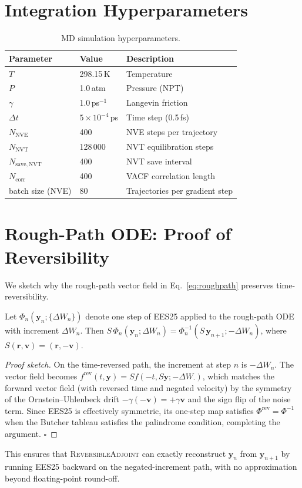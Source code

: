 \documentclass{article}
\newcommand{\EES}{\textsc{EES25}}
\newcommand{\RevAdj}{\textsc{ReversibleAdjoint}}
\begin{document}
\section{Integration Hyperparameters}
\label{app:integration}

\begin{table}[h]
\centering
\caption{MD simulation hyperparameters.}
\begin{tabular}{lll}
\toprule
Parameter & Value & Description \\
\midrule
$T$                        & 298.15\,K          & Temperature \\
$P$                        & 1.0\,atm           & Pressure (NPT) \\
$\gamma$                   & 1.0\,ps$^{-1}$     & Langevin friction \\
$\Delta t$                 & $5\times10^{-4}$\,ps & Time step (0.5\,fs) \\
$N_\mathrm{NVE}$           & 400                & NVE steps per trajectory \\
$N_\mathrm{NVT}$           & 128\,000           & NVT equilibration steps \\
$N_\mathrm{save,NVT}$      & 400                & NVT save interval \\
$N_\mathrm{corr}$          & 400                & VACF correlation length \\
batch size (NVE)           & 80                 & Trajectories per gradient step \\
\bottomrule
\end{tabular}
\end{table}

\section{Rough-Path ODE: Proof of Reversibility}
\label{app:reversibility}

We sketch why the rough-path vector field in Eq.~\eqref{eq:roughpath}
preserves time-reversibility.

\begin{claim}
Let $\Phi_n(\bm{y}_n; \{\Delta W_n\})$ denote one step of \EES{} applied to
the rough-path ODE with increment $\Delta W_n$.  Then
$S\,\Phi_n(\bm{y}_n; \Delta W_n) = \Phi_n^{-1}(S\,\bm{y}_{n+1}; -\Delta W_n)$,
where $S(\bm{r}, \bm{v}) = (\bm{r}, -\bm{v})$.
\end{claim}

\begin{proof}[Proof sketch]
On the time-reversed path, the increment at step $n$ is $-\Delta W_n$.  The
vector field becomes
$f^\mathrm{rev}(t,\bm{y}) = Sf(-t, S\bm{y}; -\Delta W_{\cdot})$,
which matches the forward vector field (with reversed time and negated
velocity) by the symmetry of the Ornstein--Uhlenbeck drift
$-\gamma(-\bm{v}) = +\gamma\bm{v}$ and the sign flip of the noise term.
Since \EES{} is effectively symmetric, its one-step map satisfies
$\Phi^\mathrm{rev} = \Phi^{-1}$ when the Butcher tableau satisfies the
palindrome condition, completing the argument. $\square$
\end{proof}

This ensures that \RevAdj{} can exactly reconstruct $\bm{y}_n$ from
$\bm{y}_{n+1}$ by running \EES{} backward on the negated-increment path,
with no approximation beyond floating-point round-off.
\end{document}
